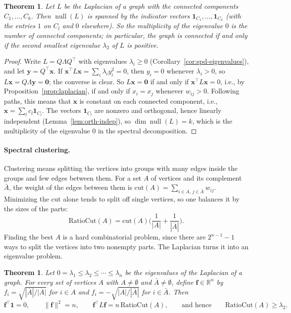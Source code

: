 \documentclass[11pt]{article}
\newcommand{\norm}[1]{\lVert #1 \rVert}
\theoremstyle{definition}
\theoremstyle{plain}
\newtheorem{theorem}[definition]{Theorem}
\theoremstyle{remark}
\DeclareMathOperator{\Null}{null}
\begin{document}
\begin{theorem}\label{thm:laplacian-components}
    Let $L$ be the Laplacian of a graph with the connected components $C_1, \ldots, C_k$. Then $\Null(L)$ is spanned by the indicator vectors $\mathbf{1}_{C_1}, \ldots, \mathbf{1}_{C_k}$ (with the entries $1$ on $C_l$ and $0$ elsewhere). So the multiplicity of the eigenvalue $0$ is the number of connected components; in particular, the graph is connected if and only if the second smallest eigenvalue $\lambda_2$ of $L$ is positive.
\end{theorem}

\begin{proof}
    Write $L = Q\Lambda Q^\top$ with eigenvalues $\lambda_i \geq 0$ (Corollary~\ref{cor:spd-eigenvalues}), and let $\mathbf{y} = Q^\top \mathbf{x}$. If $\mathbf{x}^\top L\mathbf{x} = \sum_i \lambda_iy_i^2 = 0$, then $y_i = 0$ whenever $\lambda_i > 0$, so $L\mathbf{x} = Q\Lambda \mathbf{y} = \mathbf{0}$; the converse is clear. So $L\mathbf{x} = \mathbf{0}$ if and only if $\mathbf{x}^\top L\mathbf{x} = 0$, i.e., by Proposition~\ref{prop:laplacian}, if and only if $x_i = x_j$ whenever $w_{ij} > 0$. Following paths, this means that $\mathbf{x}$ is constant on each connected component, i.e., $\mathbf{x} = \sum_l c_l\mathbf{1}_{C_l}$. The vectors $\mathbf{1}_{C_l}$ are nonzero and orthogonal, hence linearly independent (Lemma~\ref{lem:orth-indep}), so $\dim\Null(L) = k$, which is the multiplicity of the eigenvalue $0$ in the spectral decomposition.
\end{proof}

\paragraph{Spectral clustering.} Clustering means splitting the vertices into groups with many edges inside the groups and few edges between them. For a set $A$ of vertices and its complement $\bar{A}$, the weight of the edges between them is $\mathrm{cut}(A) = \sum_{i \in A, \, j \in \bar{A}} w_{ij}$. Minimizing the cut alone tends to split off single vertices, so one balances it by the sizes of the parts:
\[\mathrm{RatioCut}(A) = \mathrm{cut}(A)\Big(\frac{1}{|A|} + \frac{1}{|\bar{A}|}\Big).\]
Finding the best $A$ is a hard combinatorial problem, since there are $2^{n-1} - 1$ ways to split the vertices into two nonempty parts. The Laplacian turns it into an eigenvalue problem.

\begin{theorem}\label{thm:ratio-cut}
    Let $0 = \lambda_1 \leq \lambda_2 \leq \cdots \leq \lambda_n$ be the eigenvalues of the Laplacian of a graph. For every set of vertices $A$ with $A \neq \emptyset$ and $\bar{A} \neq \emptyset$, define $\mathbf{f} \in \mathbb{R}^n$ by $f_i = \sqrt{|\bar{A}|/|A|}$ for $i \in A$ and $f_i = -\sqrt{|A|/|\bar{A}|}$ for $i \in \bar{A}$. Then
    \[\mathbf{f}^\top\mathbf{1} = 0, \qquad \norm{\mathbf{f}}^2 = n, \qquad \mathbf{f}^\top L\mathbf{f} = n\,\mathrm{RatioCut}(A), \qquad \text{and hence} \qquad \mathrm{RatioCut}(A) \geq \lambda_2.\]
\end{theorem}
\end{document}
